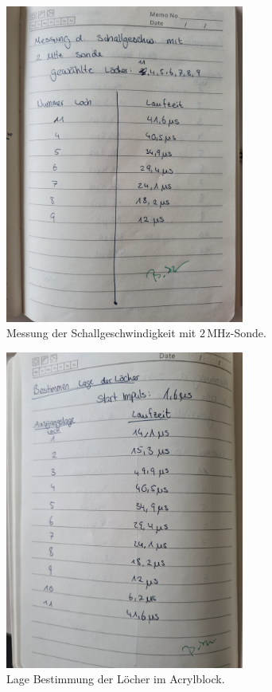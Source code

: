 \begin{figure}
    \centering
    \includegraphics[width=0.7\textwidth]{messwerte/index2.jpg}
    \caption{Messung der Schallgeschwindigkeit mit $2\,\unit{\mega\hertz}$-Sonde.}
\end{figure}

\begin{figure}
    \centering
    \includegraphics[width=0.7\textwidth]{messwerte/index3.jpg}
    \caption{Lage Bestimmung der Löcher im Acrylblock.}
\end{figure}

